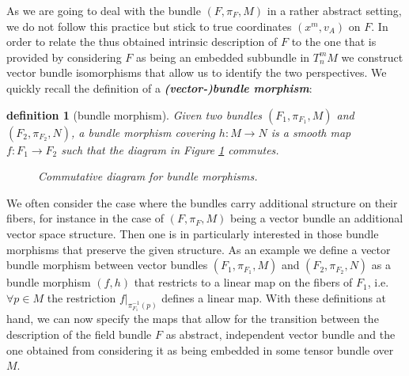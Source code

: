 \documentclass[a4paper,12pt, DIV=14, BCOR=5mm, twoside, headsepline, numbers=noenddot]{scrbook}
\newtheorem{definition}{definition}[section]
\newtheorem*{remark}{Remark}
\begin{document}
As we are going to deal with the bundle $(F, \pi_F, M)$ in a rather abstract setting, we do not follow this practice but stick to true coordinates $(x^m,v_A)$ on $F$. 
In order to relate the thus obtained intrinsic description of $F$ to the one that is provided by considering $F$ as being an embedded subbundle in $T^m_n M$ we construct vector bundle isomorphisms that allow us to identify the two perspectives. We quickly recall the definition of a \textit{\textbf{(vector-)bundle morphism}}:
\begin{definition}[bundle morphism]
Given two bundles $(F_1, \pi_{F_1}, M)$ and $(F_2, \pi_{F_2}, N)$, a bundle morphism covering $h : M \rightarrow N$ is a smooth map $f : F_1 \rightarrow F_2$ such that the diagram in Figure \ref{BundleMorph} commutes.
\begin{figure}[hbt!]
\centering 
{}
\caption{Commutative diagram for bundle morphisms.}\label{BundleMorph}
\end{figure}
\end{definition}

We often consider the case where the bundles carry additional structure on their fibers, for instance in the case of $(F, \pi_F, M)$ being a vector bundle an additional vector space structure. Then one is in particularly interested in those bundle morphisms that preserve the given structure. As an example we define a vector bundle morphism between vector bundles $(F_1, \pi_{F_1}, M)$ and $(F_2, \pi_{F_2}, N)$ as a bundle morphism $(f,h)$ that restricts to a linear map on the fibers of $F_1$, i.e. $\forall p \in M$ the restriction $f \vert_{\pi_{F_1}^{-1}(p)}$ defines a linear map.
With these definitions at hand, we can now specify the maps that allow for the transition between the description of the field bundle $F$ as abstract, independent vector bundle and the one obtained from considering it as being embedded in some tensor bundle over $M$.
\end{document}
